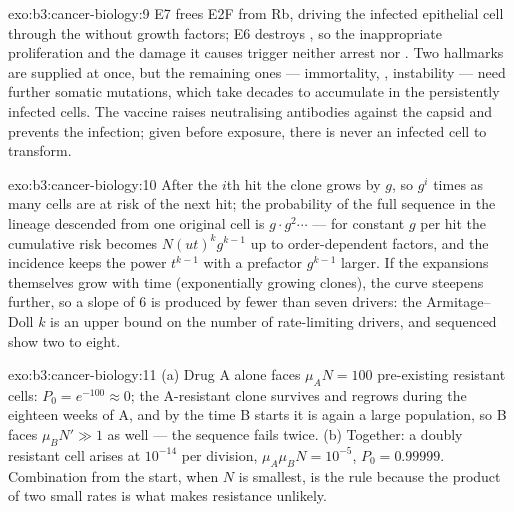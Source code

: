 \begin{solution}{exo:b3:cancer-biology:9}
E7 frees E2F from Rb, driving the infected epithelial cell through the
 without growth factors; E6 destroys , so the
inappropriate proliferation and the damage it causes trigger neither
arrest nor . Two hallmarks are supplied at once, but the
remaining ones --- immortality, , instability --- need further
somatic mutations, which take decades to accumulate in the persistently
infected cells. The vaccine raises neutralising antibodies against the
capsid and prevents the infection; given before exposure, there is
never an infected cell to transform.
\end{solution}

\begin{solution}{exo:b3:cancer-biology:10}
After the $i$th hit the clone grows by $g$, so $g^{i}$ times as many
cells are at risk of the next hit; the probability of the full sequence
in the lineage descended from one original cell is $g\cdot g^{2}\cdots$
--- for constant $g$ per hit the cumulative risk becomes $N(ut)^{k}
g^{k-1}$ up to order-dependent factors, and the incidence keeps the
power $t^{k-1}$ with a prefactor $g^{k-1}$ larger. If the expansions
themselves grow with time (exponentially growing clones), the curve
steepens further, so a slope of $6$ is produced by fewer than seven
drivers: the Armitage--Doll $k$ is an upper bound on the number of
rate-limiting drivers, and sequenced  show two to eight.
\end{solution}

\begin{solution}{exo:b3:cancer-biology:11}
(a) Drug A alone faces $\mu_{A}N = 100$ pre-existing resistant cells:
$P_{0} = e^{-100} \approx 0$; the A-resistant clone survives and
regrows during the eighteen weeks of A, and by the time B starts it is
again a large population, so B faces $\mu_{B}N' \gg 1$ as well --- the
sequence fails twice. (b) Together: a doubly resistant cell arises at
$10^{-14}$ per division, $\mu_{A}\mu_{B}N = 10^{-5}$, $P_{0} =
0.99999$. Combination from the start, when $N$ is smallest, is the
rule because the product of two small rates is what makes resistance
unlikely.
\end{solution}


